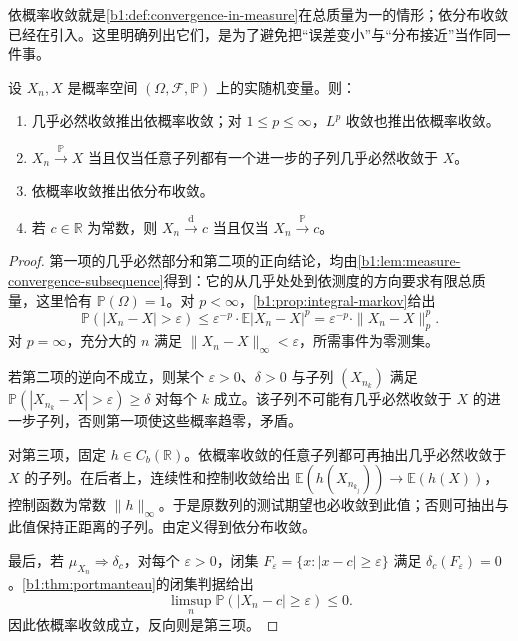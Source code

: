 依概率收敛就是\cref{b1:def:convergence-in-measure}在总质量为一的情形；依分布收敛已经在引入。这里明确列出它们，是为了避免把“误差变小”与“分布接近”当作同一件事。

\begin{proposition}\label{b1:prop:30-convergence-implications}
设 \(X_n,X\) 是概率空间 \((\Omega,\mathcal F,\mathbb P)\) 上的实随机变量。则：
\begin{enumerate}
 \item 几乎必然收敛推出依概率收敛；对 \(1\leq p\leq\infty\)，\(L^p\) 收敛也推出依概率收敛。
 \item \(X_n\xrightarrow{\mathbb P}X\) 当且仅当任意子列都有一个进一步的子列几乎必然收敛于 \(X\)。
 \item 依概率收敛推出依分布收敛。
 \item 若 \(c\in\mathbb R\) 为常数，则 \(X_n\xrightarrow{\mathrm d}c\) 当且仅当 \(X_n\xrightarrow{\mathbb P}c\)。
\end{enumerate}
\end{proposition}
\begin{proof}
第一项的几乎必然部分和第二项的正向结论，均由\cref{b1:lem:measure-convergence-subsequence}得到：它的从几乎处处到依测度的方向要求有限总质量，这里恰有 \(\mathbb P(\Omega)=1\)。对 \(p<\infty\)，\cref{b1:prop:integral-markov}给出
\[
 \mathbb P(|X_n-X|>\varepsilon)
 \leq\varepsilon^{-p}\cdot\mathbb E|X_n-X|^p
 =\varepsilon^{-p}\cdot\|X_n-X\|_p^p.
\]
对 \(p=\infty\)，充分大的 \(n\) 满足 \(\|X_n-X\|_\infty<\varepsilon\)，所需事件为零测集。

若第二项的逆向不成立，则某个 \(\varepsilon>0\)、\(\delta>0\) 与子列 \((X_{n_k})\) 满足 \(\mathbb P(|X_{n_k}-X|>\varepsilon)\geq\delta\) 对每个 \(k\) 成立。该子列不可能有几乎必然收敛于 \(X\) 的进一步子列，否则第一项使这些概率趋零，矛盾。

对第三项，固定 \(h\in C_b(\mathbb R)\)。依概率收敛的任意子列都可再抽出几乎必然收敛于 \(X\) 的子列。在后者上，连续性和控制收敛给出 \(\mathbb E(h(X_{n_{k_j}}))\to\mathbb E(h(X))\)，控制函数为常数 \(\|h\|_\infty\)。于是原数列的测试期望也必收敛到此值；否则可抽出与此值保持正距离的子列。由定义得到依分布收敛。

最后，若 \(\mu_{X_n}\Rightarrow\delta_c\)，对每个 \(\varepsilon>0\)，闭集 \(F_\varepsilon=\{x:|x-c|\geq\varepsilon\}\) 满足 \(\delta_c(F_\varepsilon)=0\)。\cref{b1:thm:portmanteau}的闭集判据给出
\[
 \limsup_n\mathbb P(|X_n-c|\geq\varepsilon)\leq0.
\]
因此依概率收敛成立，反向则是第三项。
\end{proof}

